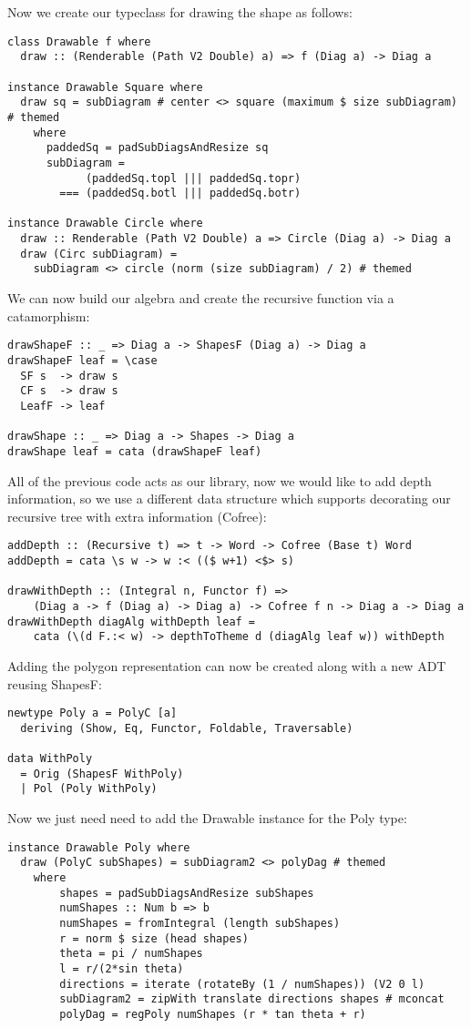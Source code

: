 Now we create our typeclass for drawing the shape as follows:
\begin{verbatim}
class Drawable f where
  draw :: (Renderable (Path V2 Double) a) => f (Diag a) -> Diag a

instance Drawable Square where
  draw sq = subDiagram # center <> square (maximum $ size subDiagram) # themed
    where
      paddedSq = padSubDiagsAndResize sq
      subDiagram =
            (paddedSq.topl ||| paddedSq.topr)
        === (paddedSq.botl ||| paddedSq.botr)

instance Drawable Circle where
  draw :: Renderable (Path V2 Double) a => Circle (Diag a) -> Diag a
  draw (Circ subDiagram) =
    subDiagram <> circle (norm (size subDiagram) / 2) # themed
\end{verbatim}
\clearpage
We can now build our algebra and create the recursive function via a catamorphism:
\begin{verbatim}
drawShapeF :: _ => Diag a -> ShapesF (Diag a) -> Diag a
drawShapeF leaf = \case
  SF s  -> draw s
  CF s  -> draw s
  LeafF -> leaf

drawShape :: _ => Diag a -> Shapes -> Diag a
drawShape leaf = cata (drawShapeF leaf)
\end{verbatim}
All of the previous code acts as our library, now we would like to add depth information, so we use a different data structure which supports decorating our recursive tree with extra information (Cofree):
\begin{verbatim}
addDepth :: (Recursive t) => t -> Word -> Cofree (Base t) Word
addDepth = cata \s w -> w :< (($ w+1) <$> s)

drawWithDepth :: (Integral n, Functor f) =>
    (Diag a -> f (Diag a) -> Diag a) -> Cofree f n -> Diag a -> Diag a
drawWithDepth diagAlg withDepth leaf =
    cata (\(d F.:< w) -> depthToTheme d (diagAlg leaf w)) withDepth
\end{verbatim}

Adding the polygon representation can now be created along with a new ADT reusing ShapesF:

\begin{verbatim}
newtype Poly a = PolyC [a]
  deriving (Show, Eq, Functor, Foldable, Traversable)

data WithPoly
  = Orig (ShapesF WithPoly)
  | Pol (Poly WithPoly)
\end{verbatim}

Now we just need need to add the Drawable instance for the Poly type:
\begin{verbatim}
instance Drawable Poly where
  draw (PolyC subShapes) = subDiagram2 <> polyDag # themed
    where
        shapes = padSubDiagsAndResize subShapes
        numShapes :: Num b => b
        numShapes = fromIntegral (length subShapes)
        r = norm $ size (head shapes)
        theta = pi / numShapes
        l = r/(2*sin theta)
        directions = iterate (rotateBy (1 / numShapes)) (V2 0 l)
        subDiagram2 = zipWith translate directions shapes # mconcat
        polyDag = regPoly numShapes (r * tan theta + r)
\end{verbatim}

